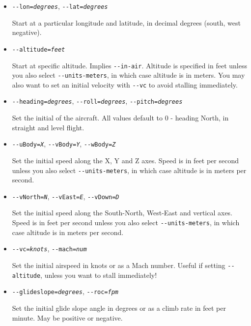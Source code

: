 \begin{itemize}
\item{\texttt{-$ $-lon={\it degrees}}, \texttt{-$ $-lat={\it degrees}}}

Start at a particular longitude and latitude, in decimal degrees (south, west negative).

\item{\texttt{-$ $-altitude={\it feet}}}

Start at specific altitude. Implies \texttt{-$ $-in-air}. Altitude is specified in feet unless you
also select \texttt{-$ $-units-meters}, in which case altitude is in meters. You may also want to set
an initial velocity with \texttt{-$ $-vc} to avoid stalling immediately.

\item{\texttt{-$ $-heading={\it degrees}}, \texttt{-$ $-roll={\it degrees}}, \texttt{-$ $-pitch={\it degrees}}}

Set the initial  of the aircraft. All values default to 0 - heading North, in straight and level flight.

\item{\texttt{-$ $-uBody={\it X}}, \texttt{-$ $-vBody={\it Y}}, \texttt{-$ $-wBody={\it Z}}}

Set the initial speed along the X, Y and Z axes. Speed is in feet per second unless you
also select \texttt{-$ $-units-meters}, in which case altitude is in meters per second.

\item{\texttt{-$ $-vNorth={\it N}}, \texttt{-$ $-vEast={\it E}}, \texttt{-$ $-vDown={\it D}}}

Set the initial speed along the South-North, West-East and vertical axes. Speed is in feet per second unless you
also select \texttt{-$ $-units-meters}, in which case altitude is in meters per second.

\item{\texttt{-$ $-vc={\it knots}}, \texttt{-$ $-mach={\it num}}}

Set the initial airspeed in knots or as a Mach number. Useful if setting \texttt{-$ $-altitude}, unless you want to stall immediately!

\item{\texttt{-$ $-glideslope={\it degrees}}, \texttt{-$ $-roc={\it fpm}}}

Set the initial glide slope angle in degrees or as a climb rate in feet per minute. May be positive or negative.

\end{itemize}

